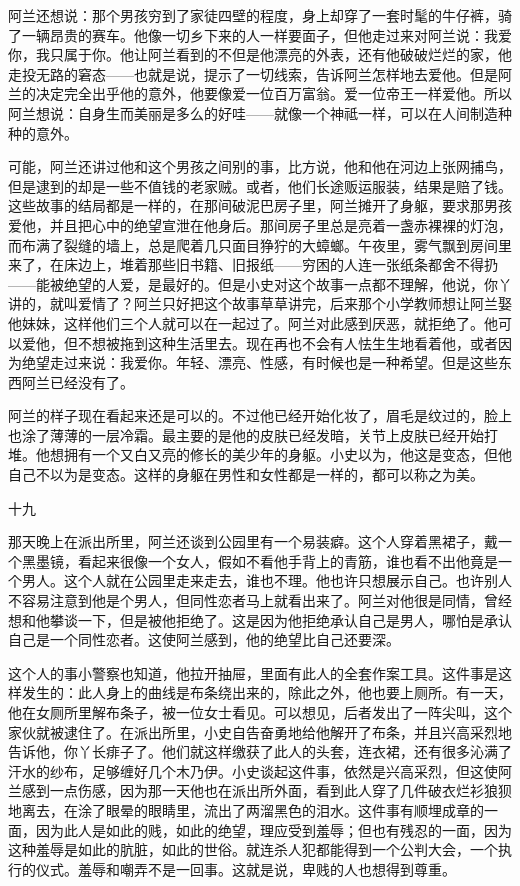 阿兰还想说：那个男孩穷到了家徒四壁的程度，身上却穿了一套时髦的牛仔裤，骑了一辆昂贵的赛车。他像一切乡下来的人一样要面子，但他走过来对阿兰说：我爱你，我只属于你。他让阿兰看到的不但是他漂亮的外表，还有他破破烂烂的家，他走投无路的窘态——也就是说，提示了一切线索，告诉阿兰怎样地去爱他。但是阿兰的决定完全出乎他的意外，他要像爱一位百万富翁。爱一位帝王一样爱他。所以阿兰想说：自身生而美丽是多么的好哇——就像一个神祗一样，可以在人间制造种种的意外。 

可能，阿兰还讲过他和这个男孩之间别的事，比方说，他和他在河边上张网捕鸟，但是逮到的却是一些不值钱的老家贼。或者，他们长途贩运服装，结果是赔了钱。这些故事的结局都是一样的，在那间破泥巴房子里，阿兰摊开了身躯，要求那男孩爱他，并且把心中的绝望宣泄在他身后。那间房子里总是亮着一盏赤裸裸的灯泡，而布满了裂缝的墙上，总是爬着几只面目狰狞的大蟑螂。午夜里，雾气飘到房间里来了，在床边上，堆着那些旧书籍、旧报纸——穷困的人连一张纸条都舍不得扔——能被绝望的人爱，是最好的。但是小史对这个故事一点都不理解，他说，你丫讲的，就叫爱情了？阿兰只好把这个故事草草讲完，后来那个小学教师想让阿兰娶他妹妹，这样他们三个人就可以在一起过了。阿兰对此感到厌恶，就拒绝了。他可以爱他，但不想被拖到这种生活里去。现在再也不会有人怯生生地看着他，或者因为绝望走过来说：我爱你。年轻、漂亮、性感，有时候也是一种希望。但是这些东西阿兰已经没有了。 

阿兰的样子现在看起来还是可以的。不过他已经开始化妆了，眉毛是纹过的，脸上也涂了薄薄的一层冷霜。最主要的是他的皮肤已经发暗，关节上皮肤已经开始打堆。他想拥有一个又白又亮的修长的美少年的身躯。小史以为，他这是变态，但他自己不以为是变态。这样的身躯在男性和女性都是一样的，都可以称之为美。 

十九 

那天晚上在派出所里，阿兰还谈到公园里有一个易装癖。这个人穿着黑裙子，戴一个黑墨镜，看起来很像一个女人，假如不看他手背上的青筋，谁也看不出他竟是一个男人。这个人就在公园里走来走去，谁也不理。他也许只想展示自己。也许别人不容易注意到他是个男人，但同性恋者马上就看出来了。阿兰对他很是同情，曾经想和他攀谈一下，但是被他拒绝了。这是因为他拒绝承认自己是男人，哪怕是承认自己是一个同性恋者。这使阿兰感到，他的绝望比自己还要深。 

这个人的事小警察也知道，他拉开抽屉，里面有此人的全套作案工具。这件事是这样发生的：此人身上的曲线是布条绕出来的，除此之外，他也要上厕所。有一天，他在女厕所里解布条子，被一位女士看见。可以想见，后者发出了一阵尖叫，这个家伙就被逮住了。在派出所里，小史自告奋勇地给他解开了布条，并且兴高采烈地告诉他，你丫长痱子了。他们就这样缴获了此人的头套，连衣裙，还有很多沁满了汗水的纱布，足够缠好几个木乃伊。小史谈起这件事，依然是兴高采烈，但这使阿兰感到一点伤感，因为那一天他也在派出所外面，看到此人穿了几件破衣烂衫狼狈地离去，在涂了眼晕的眼睛里，流出了两溜黑色的泪水。这件事有顺埋成章的一面，因为此人是如此的贱，如此的绝望，理应受到羞辱；但也有残忍的一面，因为这种羞辱是如此的肮脏，如此的世俗。就连杀人犯都能得到一个公判大会，一个执行的仪式。羞辱和嘲弄不是一回事。这就是说，卑贱的人也想得到尊重。 

